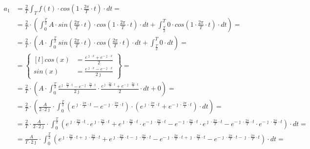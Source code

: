 \begin{task}

\begin{align*}
a_1&=\frac{2}{T}\int_{T}f(t) \cdot cos\left( 1 \cdot \frac{2\pi}{T} \cdot t\right) \cdot dt=\\
&=\frac{2}{T}\cdot\left(\int_{0}^{\frac{T}{2}}A \cdot sin\left( \frac{2\pi}{T} \cdot t\right) \cdot cos\left( 1 \cdot \frac{2\pi}{T} \cdot t\right) \cdot dt+\int_{\frac{T}{2}}^{T} 0 \cdot cos\left( 1 \cdot \frac{2\pi}{T} \cdot t\right) \cdot dt\right)=\\
&=\frac{2}{T}\cdot\left(A \cdot \int_{0}^{\frac{T}{2}}sin\left( \frac{2\pi}{T} \cdot t\right) \cdot cos\left( \frac{2\pi}{T} \cdot t\right) \cdot dt+\int_{\frac{T}{2}}^{T} 0 \cdot dt\right)=\\
&=\begin{Bmatrix*}[l]
cos\left(x\right)&=\frac{e^{\jmath \cdot x}+e^{-\jmath \cdot x}}{2}\\
sin\left(x\right)&=\frac{e^{\jmath \cdot x}-e^{-\jmath \cdot x}}{2 \jmath }
\end{Bmatrix*}=\\
&=\frac{2}{T}\cdot\left(A \cdot \int_{0}^{\frac{T}{2}} \frac{e^{\jmath \cdot \frac{2\pi}{T} \cdot t}-e^{-\jmath \cdot \frac{2\pi}{T} \cdot t}}{2\jmath} \cdot \frac{e^{\jmath \cdot \frac{2\pi}{T} \cdot t}+e^{-\jmath \cdot \frac{2\pi}{T} \cdot t}}{2} \cdot dt+0\right)=\\
&=\frac{2}{T}\cdot\left(\frac{A}{2\cdot 2\jmath} \cdot \int_{0}^{\frac{T}{2}} \left(e^{\jmath \cdot \frac{2\pi}{T} \cdot t}-e^{-\jmath \cdot \frac{2\pi}{T} \cdot t}\right)\cdot \left(e^{\jmath \cdot \frac{2\pi}{T} \cdot t}+e^{-\jmath \cdot \frac{2\pi}{T} \cdot t}\right) \cdot dt\right)=\\
&=\frac{2}{T} \cdot \frac{A}{2\cdot 2\jmath} \cdot \int_{0}^{\frac{T}{2}}
\left(e^{\jmath \cdot \frac{2\pi}{T} \cdot t} \cdot e^{\jmath \cdot \frac{2\pi}{T} \cdot t} + e^{\jmath \cdot \frac{2\pi}{T} \cdot t} \cdot e^{-\jmath \cdot \frac{2\pi}{T} \cdot t} - e^{-\jmath \cdot \frac{2\pi}{T} \cdot t} \cdot e^{\jmath \cdot \frac{2\pi}{T} \cdot t} - e^{-\jmath \cdot \frac{2\pi}{T} \cdot t} \cdot e^{-\jmath \cdot \frac{2\pi}{T} \cdot t} \right) \cdot dt=\\
&=\frac{A}{T\cdot 2\jmath} \cdot \int_{0}^{\frac{T}{2}}
\left(e^{\jmath \cdot \frac{2\pi}{T} \cdot t + \jmath \cdot \frac{2\pi}{T} \cdot t} + e^{\jmath \cdot \frac{2\pi}{T} \cdot t -\jmath \cdot \frac{2\pi}{T} \cdot t} - e^{-\jmath \cdot \frac{2\pi}{T} \cdot t+ \jmath \cdot \frac{2\pi}{T} \cdot t} - e^{-\jmath \cdot \frac{2\pi}{T} \cdot t -\jmath \cdot \frac{2\pi}{T} \cdot t} \right) \cdot dt=\\

\end{align*}
\end{task}
